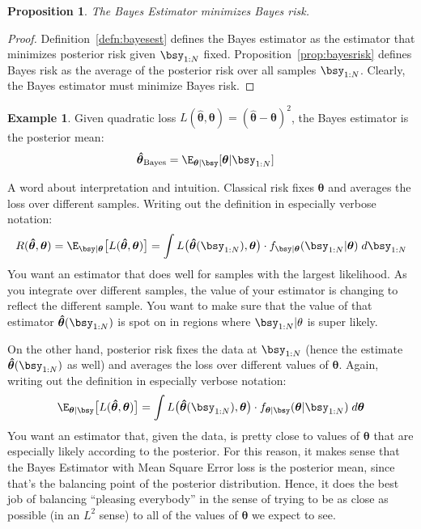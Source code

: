 \documentclass[12pt]{article}
\theoremstyle{plain}
\newtheorem{prop}[thm]{Proposition}
\theoremstyle{definition}
\newtheorem{ex}[thm]{Example}
\theoremstyle{remark}
\newcommand{\bstheta}{\boldsymbol{\theta}}
\newcommand{\bshattheta}{\boldsymbol{\hat{\theta}}}
\begin{document}
\begin{prop}
The Bayes Estimator minimizes Bayes risk.
\end{prop}
\begin{proof}
Definition~\ref{defn:bayesest} defines the Bayes estimator as the
estimator that minimizes posterior risk given $\bsy_{1:N}$ fixed.
Proposition~\ref{prop:bayesrisk} defines Bayes risk as the average of
the posterior risk over all samples $\bsy_{1:N}$. Clearly, the Bayes
estimator must minimize Bayes risk.
\end{proof}


\begin{ex}
Given quadratic loss $L(\bshattheta,\bstheta) =
(\bshattheta-\bstheta)^2$, the Bayes estimator is the posterior mean:
\begin{align*}
  \bshattheta_{\text{Bayes}}
  &= \E_{\bstheta|\bsy}[\bstheta|\bsy_{1:N}]
\end{align*}
\end{ex}

A word about interpretation and intuition. Classical risk fixes
$\bstheta$ and averages the loss over different samples. Writing out the
definition in especially verbose notation:
\begin{align*}
  R(\bshattheta,\bstheta)=
  \E_{\bsy|\bstheta}\big[
    L(\bshattheta,\bstheta)
  \big] =
  \int L\big(\bshattheta(\bsy_{1:N}),\bstheta\big)
    \cdot f_{\bsy|\bstheta}(\bsy_{1:N}|\bstheta)\; d\bsy_{1:N}
\end{align*}
You want an estimator that does well for samples with the largest
likelihood. As you integrate over different samples, the value of your
estimator is changing to reflect the different sample. You want to make
sure that the value of that estimator $\bshattheta(\bsy_{1:N})$ is
spot on in regions where $\bsy_{1:N}|\theta$ is super likely.

On the other hand, posterior risk fixes the data at $\bsy_{1:N}$ (hence
the estimate $\bshattheta(\bsy_{1:N})$ as well) and averages the loss
over different values of $\bstheta$.
Again, writing out the definition in especially verbose notation:
\begin{align*}
  \E_{\bstheta|\bsy}\big[
    L(\bshattheta,\bstheta)
  \big] =
  \int L\big(\bshattheta(\bsy_{1:N}),\bstheta\big)
    \cdot f_{\bstheta|\bsy}(\bstheta|\bsy_{1:N})\; d\bstheta
\end{align*}
You want an estimator that, given the data, is pretty close to values of
$\bstheta$ that are especially likely according to the posterior.  For
this reason, it makes sense that the Bayes Estimator with Mean Square
Error loss is the posterior mean, since that's the balancing point of
the posterior distribution. Hence, it does the best job of balancing
``pleasing everybody'' in the sense of trying to be as close as possible
(in an $L^2$ sense) to all of the values of $\bstheta$ we expect to see.
\end{document}
